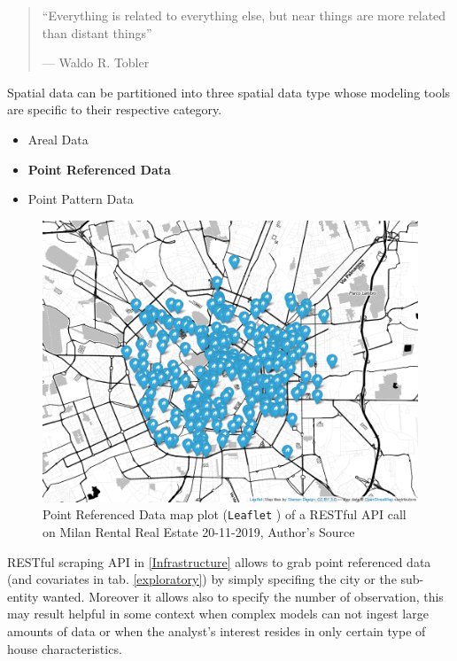\documentclass[
  12pt,
  a4paper,
  oneside]{book}
\newcommand{\passthrough}[1]{#1}
\providecommand{\tightlist}{%
  \setlength{\itemsep}{0pt}\setlength{\parskip}{0pt}}
\theoremstyle{definition}
\theoremstyle{definition}
\theoremstyle{definition}
\theoremstyle{remark}
\begin{document}
\begin{quote}
``Everything is related to everything else,
but near things are more related than distant things''

\hfill --- Waldo R. Tobler
\end{quote}

Spatial data can be partitioned into three spatial data type whose modeling tools are specific to their respective category.

\begin{itemize}
\tightlist
\item
  Areal Data
\item
  \textbf{Point Referenced Data}
\item
  Point Pattern Data
\end{itemize}

\begin{figure}
\centering
\includegraphics{images/map.png}
\caption{\label{fig:prdmap}Point Referenced Data map plot (\passthrough{\lstinline!Leaflet!} \citet{leaflet}) of a RESTful API call on Milan Rental Real Estate 20-11-2019, Author's Source}
\end{figure}

RESTful scraping API in \ref{Infrastructure} allows to grab point referenced data (and covariates in tab. \ref{exploratory}) by simply specifing the city or the sub-entity wanted. Moreover it allows also to specify the number of observation, this may result helpful in some context when complex models can not ingest large amounts of data or when the analyst's interest resides in only certain type of house characteristics.
\end{document}
